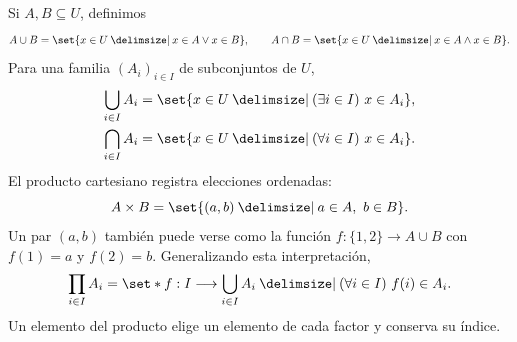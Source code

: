 Si $A,B\subseteq U$, definimos
\[
A\cup B=\set{x\in U\given x\in A\lor x\in B},\qquad
A\cap B=\set{x\in U\given x\in A\land x\in B}.
\]
Para una familia $(A_i)_{i\in I}$ de subconjuntos de $U$,
\[
\begin{aligned}
\bigcup_{i\in I}A_i&=\set{x\in U\given(\exists i\in I)\ x\in A_i},\\
\bigcap_{i\in I}A_i&=\set{x\in U\given(\forall i\in I)\ x\in A_i}.
\end{aligned}
\]
El producto cartesiano registra elecciones ordenadas:
\[
A\times B=\set{(a,b)\given a\in A,\ b\in B}.
\]
Un par $(a,b)$ también puede verse como la función $f:\{1,2\}\to A\cup B$ con $f(1)=a$ y $f(2)=b$. Generalizando esta interpretación,
\[
\prod_{i\in I}A_i=
\set*{f:I\longrightarrow\bigcup_{i\in I}A_i\given
                 (\forall i\in I)\ f(i)\in A_i}.
\]
Un elemento del producto elige un elemento de cada factor y conserva su índice.
